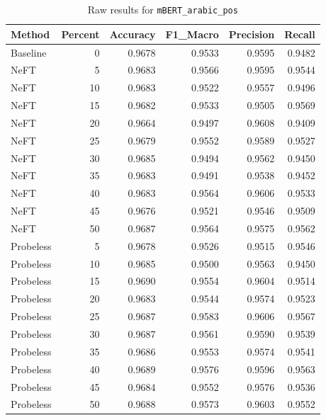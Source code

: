 \documentclass[12pt]{article}
\begin{document}
\begin{table}[H]
\centering
\caption{Raw results for \texttt{mBERT\_arabic\_pos}}
\label{tab:mbert-arabic-pos}
\begin{tabular}{lrrrrr}
\toprule
Method & Percent & Accuracy & F1\_Macro & Precision & Recall \\
\midrule
Baseline & 0 & 0.9678 & 0.9533 & 0.9595 & 0.9482 \\
NeFT & 5 & 0.9683 & 0.9566 & 0.9595 & 0.9544 \\
NeFT & 10 & 0.9683 & 0.9522 & 0.9557 & 0.9496 \\
NeFT & 15 & 0.9682 & 0.9533 & 0.9505 & 0.9569 \\
NeFT & 20 & 0.9664 & 0.9497 & 0.9608 & 0.9409 \\
NeFT & 25 & 0.9679 & 0.9552 & 0.9589 & 0.9527 \\
NeFT & 30 & 0.9685 & 0.9494 & 0.9562 & 0.9450 \\
NeFT & 35 & 0.9683 & 0.9491 & 0.9538 & 0.9452 \\
NeFT & 40 & 0.9683 & 0.9564 & 0.9606 & 0.9533 \\
NeFT & 45 & 0.9676 & 0.9521 & 0.9546 & 0.9509 \\
NeFT & 50 & 0.9687 & 0.9564 & 0.9575 & 0.9562 \\
Probeless & 5 & 0.9678 & 0.9526 & 0.9515 & 0.9546 \\
Probeless & 10 & 0.9685 & 0.9500 & 0.9563 & 0.9450 \\
Probeless & 15 & 0.9690 & 0.9554 & 0.9604 & 0.9514 \\
Probeless & 20 & 0.9683 & 0.9544 & 0.9574 & 0.9523 \\
Probeless & 25 & 0.9687 & 0.9583 & 0.9606 & 0.9567 \\
Probeless & 30 & 0.9687 & 0.9561 & 0.9590 & 0.9539 \\
Probeless & 35 & 0.9686 & 0.9553 & 0.9574 & 0.9541 \\
Probeless & 40 & 0.9689 & 0.9576 & 0.9596 & 0.9563 \\
Probeless & 45 & 0.9684 & 0.9552 & 0.9576 & 0.9536 \\
Probeless & 50 & 0.9688 & 0.9573 & 0.9603 & 0.9552 \\
\bottomrule
\end{tabular}
\end{table}
\end{document}
